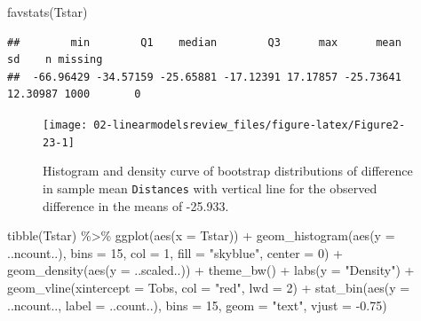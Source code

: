 \documentclass[
]{book}
\newenvironment{Shaded}{\begin{snugshade}}{\end{snugshade}}
\newcommand{\AttributeTok}[1]{\textcolor[rgb]{0.77,0.63,0.00}{#1}}
\newcommand{\DecValTok}[1]{\textcolor[rgb]{0.00,0.00,0.81}{#1}}
\newcommand{\FloatTok}[1]{\textcolor[rgb]{0.00,0.00,0.81}{#1}}
\newcommand{\FunctionTok}[1]{\textcolor[rgb]{0.00,0.00,0.00}{#1}}
\newcommand{\NormalTok}[1]{#1}
\newcommand{\SpecialCharTok}[1]{\textcolor[rgb]{0.00,0.00,0.00}{#1}}
\newcommand{\StringTok}[1]{\textcolor[rgb]{0.31,0.60,0.02}{#1}}
\begin{document}
\begin{Shaded}
\begin{Highlighting}[]
\FunctionTok{favstats}\NormalTok{(Tstar)}
\end{Highlighting}
\end{Shaded}

\begin{verbatim}
##        min        Q1    median        Q3      max      mean       sd    n missing
##  -66.96429 -34.57159 -25.65881 -17.12391 17.17857 -25.73641 12.30987 1000       0
\end{verbatim}



\begin{figure}[ht!]

{\centering \texttt{[image: 02-linearmodelsreview\_files/figure-latex/Figure2-23-1]} 

}

\caption{Histogram and density curve of bootstrap distributions of difference in sample mean \texttt{Distances} with vertical line for the observed difference in the means of -25.933.}\label{fig:Figure2-23}
\end{figure}

\begin{Shaded}
\begin{Highlighting}[]
\FunctionTok{tibble}\NormalTok{(Tstar) }\SpecialCharTok{\%\textgreater{}\%} \FunctionTok{ggplot}\NormalTok{(}\FunctionTok{aes}\NormalTok{(}\AttributeTok{x =}\NormalTok{ Tstar)) }\SpecialCharTok{+} 
  \FunctionTok{geom\_histogram}\NormalTok{(}\FunctionTok{aes}\NormalTok{(}\AttributeTok{y =}\NormalTok{ ..ncount..), }\AttributeTok{bins =} \DecValTok{15}\NormalTok{, }\AttributeTok{col =} \DecValTok{1}\NormalTok{, }\AttributeTok{fill =} \StringTok{"skyblue"}\NormalTok{, }\AttributeTok{center =} \DecValTok{0}\NormalTok{) }\SpecialCharTok{+} 
  \FunctionTok{geom\_density}\NormalTok{(}\FunctionTok{aes}\NormalTok{(}\AttributeTok{y =}\NormalTok{ ..scaled..)) }\SpecialCharTok{+}
  \FunctionTok{theme\_bw}\NormalTok{() }\SpecialCharTok{+}
  \FunctionTok{labs}\NormalTok{(}\AttributeTok{y =} \StringTok{"Density"}\NormalTok{) }\SpecialCharTok{+}
  \FunctionTok{geom\_vline}\NormalTok{(}\AttributeTok{xintercept =}\NormalTok{ Tobs, }\AttributeTok{col =} \StringTok{"red"}\NormalTok{, }\AttributeTok{lwd =} \DecValTok{2}\NormalTok{) }\SpecialCharTok{+}
  \FunctionTok{stat\_bin}\NormalTok{(}\FunctionTok{aes}\NormalTok{(}\AttributeTok{y =}\NormalTok{ ..ncount.., }\AttributeTok{label =}\NormalTok{ ..count..), }\AttributeTok{bins =} \DecValTok{15}\NormalTok{, }
           \AttributeTok{geom =} \StringTok{"text"}\NormalTok{, }\AttributeTok{vjust =} \SpecialCharTok{{-}}\FloatTok{0.75}\NormalTok{)}
\end{Highlighting}
\end{Shaded}
\end{document}
